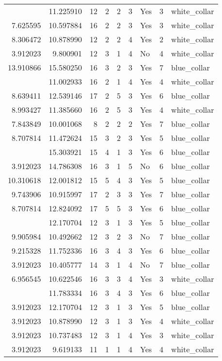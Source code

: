 \documentclass[
]{article}
\begin{document}
\begin{longtable}[t]{rrrrrllrl}
\addlinespace
7.575585 & 11.225910 & 12 & 2 & 2 & 3 & Yes & 3 & white\_collar\\
7.625595 & 10.597884 & 16 & 2 & 2 & 3 & Yes & 3 & white\_collar\\
8.306472 & 10.878990 & 12 & 2 & 2 & 4 & Yes & 2 & white\_collar\\
3.912023 & 9.800901 & 12 & 3 & 1 & 4 & No & 4 & white\_collar\\
13.910866 & 15.580250 & 16 & 3 & 2 & 3 & Yes & 7 & blue\_collar\\
\addlinespace
3.912023 & 11.002933 & 16 & 2 & 1 & 4 & Yes & 4 & white\_collar\\
8.639411 & 12.539146 & 17 & 2 & 5 & 3 & Yes & 6 & blue\_collar\\
8.993427 & 11.385660 & 16 & 2 & 5 & 3 & Yes & 4 & white\_collar\\
7.843849 & 10.001068 & 8 & 2 & 2 & 2 & Yes & 7 & blue\_collar\\
8.707814 & 11.472624 & 15 & 3 & 2 & 3 & Yes & 5 & blue\_collar\\
\addlinespace
3.912023 & 15.303921 & 15 & 4 & 1 & 3 & Yes & 6 & blue\_collar\\
3.912023 & 14.786308 & 16 & 3 & 1 & 5 & No & 6 & blue\_collar\\
10.310618 & 12.001812 & 15 & 5 & 4 & 3 & Yes & 5 & blue\_collar\\
9.743906 & 10.915997 & 17 & 2 & 3 & 3 & Yes & 7 & blue\_collar\\
8.707814 & 12.824092 & 17 & 5 & 5 & 3 & Yes & 6 & blue\_collar\\
\addlinespace
3.912023 & 12.170704 & 12 & 3 & 1 & 3 & Yes & 5 & blue\_collar\\
9.905984 & 10.492662 & 12 & 3 & 2 & 3 & No & 7 & blue\_collar\\
9.215328 & 11.752336 & 16 & 3 & 4 & 3 & Yes & 6 & blue\_collar\\
3.912023 & 10.405777 & 14 & 3 & 1 & 4 & No & 7 & blue\_collar\\
6.956545 & 10.622546 & 16 & 3 & 3 & 4 & Yes & 3 & white\_collar\\
\addlinespace
8.306472 & 11.783334 & 16 & 3 & 4 & 3 & Yes & 6 & blue\_collar\\
3.912023 & 12.170704 & 12 & 3 & 1 & 3 & Yes & 5 & blue\_collar\\
3.912023 & 10.878990 & 12 & 3 & 1 & 3 & Yes & 4 & white\_collar\\
3.912023 & 10.737483 & 12 & 3 & 1 & 4 & Yes & 3 & white\_collar\\
3.912023 & 9.619133 & 11 & 1 & 1 & 4 & Yes & 4 & white\_collar\\

\end{longtable}
\end{document}
